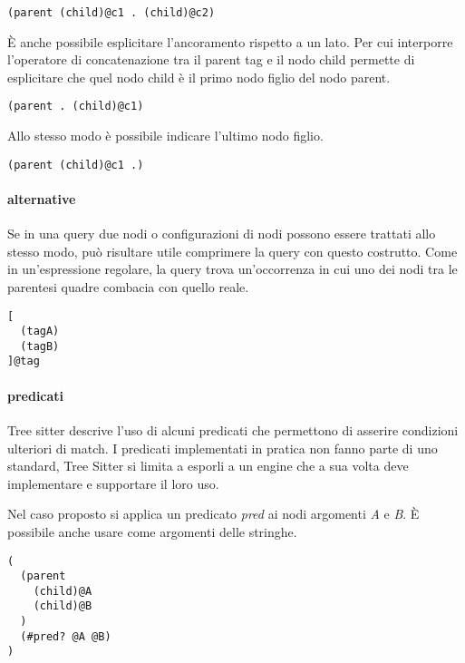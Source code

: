 \begin{lstlisting}
(parent (child)@c1 . (child)@c2)
\end{lstlisting}

\`E anche possibile esplicitare l'ancoramento rispetto a un lato.
Per cui interporre l'operatore di concatenazione tra il parent tag e il nodo child permette di esplicitare che quel nodo child \`e il primo nodo figlio del nodo parent.

\begin{lstlisting}
(parent . (child)@c1)
\end{lstlisting}

Allo stesso modo \`e possibile indicare l'ultimo nodo figlio.

\begin{lstlisting}
(parent (child)@c1 .)
\end{lstlisting}

\paragraph{alternative}

Se in una query due nodi o configurazioni di nodi possono essere trattati allo stesso modo, pu\`o risultare utile comprimere la query con questo costrutto.
Come in un'espressione regolare, la query trova un'occorrenza in cui uno dei nodi tra le parentesi quadre combacia con quello reale.

\begin{lstlisting}
[
  (tagA)
  (tagB)
]@tag
\end{lstlisting}

\paragraph{predicati}

Tree sitter descrive l'uso di alcuni predicati che permettono di asserire condizioni ulteriori di match.
I predicati implementati in pratica non fanno parte di uno standard, Tree Sitter si limita a esporli a un engine che a sua volta deve implementare e supportare il loro uso.

Nel caso proposto si applica un predicato \emph{pred} ai nodi argomenti \emph{A} e \emph{B}.
\`E possibile anche usare come argomenti delle stringhe.

\begin{lstlisting}
(
  (parent
    (child)@A
    (child)@B
  )
  (#pred? @A @B)
)
\end{lstlisting}
